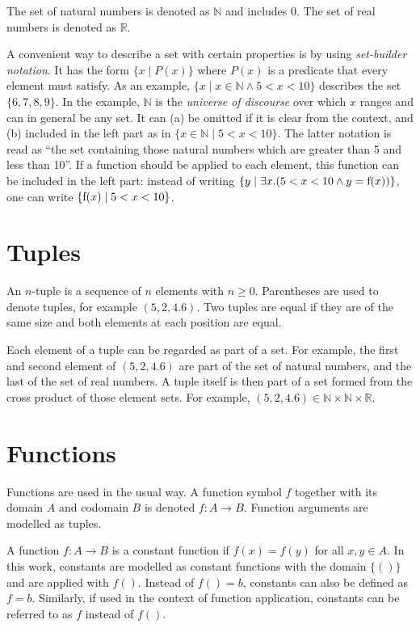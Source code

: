 \documentclass[
    a4paper,
    12pt,
    twoside,
    BCOR=12mm,
    parskip=half,
    chapterprefix,
    numbers=noenddot,
    bibliography=totoc
]{scrbook}
\begin{document}
The set of natural numbers is denoted as $\mathbb{N}$ and includes 0. The set of real numbers is denoted as $\mathbb{R}$.

A convenient way to describe a set with certain properties is by using \emph{set-builder notation}. It has the form $\{x \mid P(x)\}$ where $P(x)$ is a predicate that every element must satisfy. As an example, $\{x \mid x \in \mathbb{N} \wedge 5 < x < 10\}$ describes the set $\{6,7,8,9\}$. In the example, $\mathbb{N}$ is the \emph{universe of discourse} over which $x$ ranges and can in general be any set. It can (a) be omitted if it is clear from the context, and (b) included in the left part as in $\{x \in \mathbb{N} \mid 5 < x < 10\}$. The latter notation is read as ``the set containing those natural numbers which are greater than 5 and less than 10''. If a function should be applied to each element, this function can be included in the left part: instead of writing $\{y \mid \exists x.(5 < x < 10 \wedge y = \mathrm{f}(x))\}$, one can write $\{\mathrm{f}(x) \mid 5 < x < 10\}$.

\section{Tuples}

An $n$-tuple is a sequence of $n$ elements with $n \geq 0$. Parentheses are used to denote tuples, for example $(5,2,4.6)$. Two tuples are equal if they are of the same size and both elements at each position are equal.

Each element of a tuple can be regarded as part of a set. For example, the first and second element of $(5,2,4.6)$ are part of the set of natural numbers, and the last of the set of real numbers. A tuple itself is then part of a set formed from the cross product of those element sets. For example, $(5,2,4.6) \in \mathbb{N} \times \mathbb{N} \times \mathbb{R}$.

\section{Functions}

Functions are used in the usual way. A function symbol $f$ together with its domain $A$ and codomain $B$ is denoted $f: A \to B$. Function arguments are modelled as tuples. 

A function $f: A \to B$ is a constant function if $f(x) = f(y)$ for all $x,y \in A$. In this work, constants are modelled as constant functions with the domain $\{()\}$ and are applied with $f()$. Instead of $f() = b$, constants can also be defined as $f = b$. Similarly, if used in the context of function application, constants can be referred to as $f$ instead of $f()$.
\end{document}
